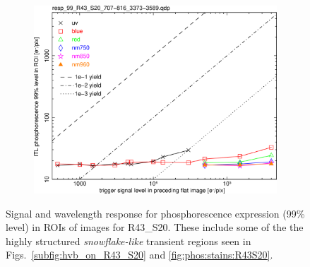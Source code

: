 \begin{figure}[!htbp]
\centering
\begin{subfigure}{0.45\textwidth}    
  \centering
  \includegraphics[width=\textwidth]{figures/phosphorescence-survey/phos_resp/resp_99_R43_S20_707-816_3373-3589.png}    
\end{subfigure}
\newline
\caption{Signal and wavelength response for phosphorescence expression (99\% level) in ROIs of images for R43\_S20. These include some of the the highly structured {\it snowflake-like} transient regions seen in Figs.~\ref{subfig:hvb_on_R43_S20} and \ref{fig:phos:stains:R43S20}.}
\label{fig:phos:resp:R43S20}
\end{figure}

